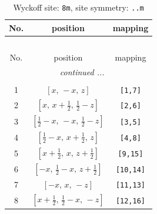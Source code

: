 \documentclass[fleqn,8pt]{jsarticle}
\begin{document}
\begin{longtable}{ccc}
\caption{Wyckoff site: {\tt 8m}, site symmetry: {\tt ..m}}
 \\
 \hline \hline
No. & position & mapping \\ \hline \endfirsthead

\multicolumn{2}{l}{\tablename\ \thetable{}} \\
 \hline \hline
No. & position & mapping \\ \hline \endhead

 \hline \hline
\multicolumn{2}{r}{\footnotesize\it continued ...} \\ \endfoot

 \hline \hline
\multicolumn{2}{r}{} \\ \endlastfoot

1 & $\left[ x,\, - x,\, z \right]$ & {\tt [1,7]} \\ \hline
2 & $\left[ x,\, x + \frac{1}{2},\, \frac{1}{2} - z \right]$ & {\tt [2,6]} \\ \hline
3 & $\left[ \frac{1}{2} - x,\, - x,\, \frac{1}{2} - z \right]$ & {\tt [3,5]} \\ \hline
4 & $\left[ \frac{1}{2} - x,\, x + \frac{1}{2},\, z \right]$ & {\tt [4,8]} \\ \hline
5 & $\left[ x + \frac{1}{2},\, x,\, z + \frac{1}{2} \right]$ & {\tt [9,15]} \\ \hline
6 & $\left[ - x,\, \frac{1}{2} - x,\, z + \frac{1}{2} \right]$ & {\tt [10,14]} \\ \hline
7 & $\left[ - x,\, x,\, - z \right]$ & {\tt [11,13]} \\ \hline
8 & $\left[ x + \frac{1}{2},\, \frac{1}{2} - x,\, - z \right]$ & {\tt [12,16]} \\
\end{longtable}
\renewcommand{\arraystretch}{1.2}
\end{document}
